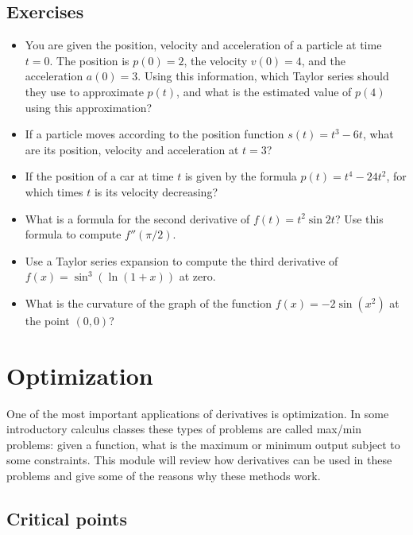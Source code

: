 \documentclass[twoside,openright,titlepage,a4paper]{book}
\begin{document}
\begin{sloppypar}
\subsection{Exercises}
\begin{itemize}
\item You are given the position, velocity and acceleration of a particle at time $t = 0$. The position is $p(0) = 2$, the velocity $v(0) = 4$, and the acceleration $a(0) = 3$. Using this information, which Taylor series should they use to approximate $p(t)$, and what is the estimated value of $p(4)$ using this approximation?
\item If a particle moves according to the position function $s(t) = t^3-6t$, what are its position, velocity and acceleration at $t=3$?
\item If the position of a car at time $t$ is given by the formula $p(t) = t^4 - 24t^2$, for which times $t$ is its velocity decreasing?
\item What is a formula for the second derivative of $f(t) = t^2\sin 2t$? Use this formula to compute $f''(\pi/2)$.
\item Use a Taylor series expansion to compute the third derivative of $f(x) = \sin^3 \left(\ln(1+x) \right)$ at zero.
\item What is the curvature of the graph of the function $f(x) = -2\sin(x^2)$ at the point $(0,0)$?
\end{itemize}

\section{Optimization} \label{ChDifferentiationSecOptimization}

One of the most important applications of derivatives is optimization. In some introductory calculus classes these types of problems are called max/min problems: given a function, what is the maximum or minimum output subject to some constraints. This module will review how derivatives can be used in these problems and give some of the reasons why these methods work.

\subsection{Critical points}


\end{sloppypar}
\end{document}
